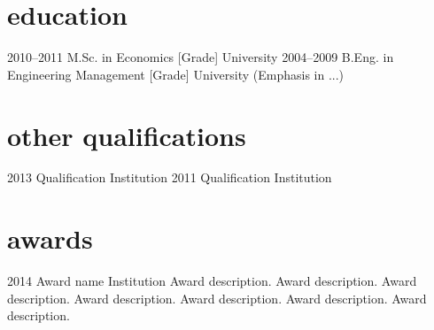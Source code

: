\documentclass[]{cv-style}          %
\begin{document}
	\section{education}
	
	\begin{entrylist}
		\entry
		{2010--2011}
		{M.Sc. {\normalfont in Economics [Grade]}}
		{University}
		{\vspace{-0.3cm}}
		\entry
		{2004--2009}
		{B.Eng. {\normalfont in Engineering Management [Grade]}}
		{University}
		{(Emphasis in ...)}
	\end{entrylist}
	
	
	\section{other qualifications}
	
	\begin{entrylist}
		\entry
		{2013}
		{Qualification}
		{Institution}
		{\vspace{-0.3cm}}
		\entry
		{2011}
		{Qualification}
		{Institution}
		{\vspace{-0.3cm}}
	\end{entrylist}
	
	
	\section{awards}
	
	\begin{entrylist}
		\entry
		{2014}
		{Award name}
		{Institution}
		{Award description. Award description. Award description. Award description. Award description. Award description. Award description. }
	\end{entrylist}
	
\end{document}
